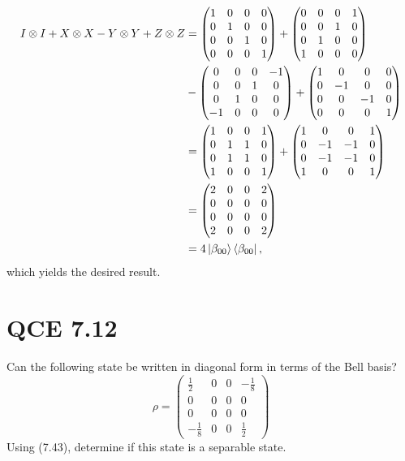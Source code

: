 \documentclass[10pt]{article}
\begin{document}
\begin{align*}
I \otimes I + X \otimes X - Y \otimes Y + Z \otimes Z &=
\begin{pmatrix}
1 & 0 & 0 & 0 \\
0 & 1 & 0 & 0 \\
0 & 0 & 1 & 0 \\
0 & 0 & 0 & 1 
\end{pmatrix} 
+
\begin{pmatrix}
0 & 0 & 0 & 1 \\
0 & 0 & 1 & 0 \\
0 & 1 & 0 & 0 \\
1 & 0 & 0 & 0 
\end{pmatrix} \\
&- 
\begin{pmatrix}
0 & 0 & 0 & - 1 \\
0 & 0 & 1 & 0 \\
0 & 1 & 0 & 0 \\
-1 & 0 & 0 & 0 
\end{pmatrix}
+ 
\begin{pmatrix}
1 & 0 & 0 & 0 \\
0 & -1 & 0 & 0 \\
0 & 0 & -1 & 0 \\
0 & 0 & 0 & 1
\end{pmatrix} \\
&= 
\begin{pmatrix}
1 & 0 & 0 & 1 \\
0 & 1 & 1 & 0 \\
0 & 1 & 1 & 0 \\
1 & 0 & 0 & 1 
\end{pmatrix}
+
\begin{pmatrix}
1 & 0 & 0 & 1 \\
0 & -1 & -1 & 0 \\
0 & -1 & -1 & 0 \\
1 & 0 & 0 & 1 
\end{pmatrix} \\
&= 
\begin{pmatrix}
2 & 0 & 0 & 2 \\
0 & 0 & 0 & 0 \\
0 & 0 & 0 & 0 \\
2 & 0 & 0 & 2 
\end{pmatrix} \\
&= 4\ket{\beta_{00}} \bra{\beta_{00}},
\end{align*}
which yields the desired result.

\section*{QCE 7.12}
Can the following state be written in diagonal form in terms of the Bell basis?
\[
\rho = \begin{pmatrix}
\frac{1}{2} & 0 & 0 & -\frac{1}{8} \\
0 & 0 & 0 & 0 \\
0 & 0 & 0 & 0 \\
-\frac{1}{8} & 0 & 0 & \frac{1}{2} 
\end{pmatrix}
\]
Using (7.43), determine if this state is a separable state. 
\end{document}
